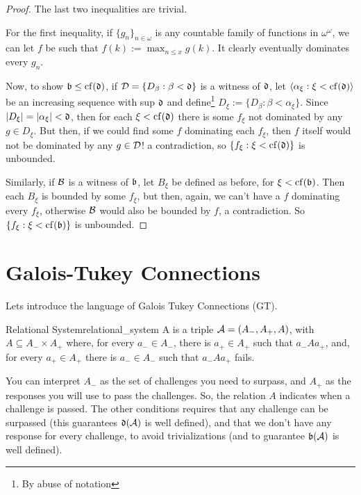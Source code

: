 \begin{proof}
    The last two inequalities are trivial.

    For the first inequality, if $\{g_n\}_{n\in\omega}$ is any countable family of functions in $\omega^\omega$, we can let $f$ be such that $f(k):=\max_{n\leq x}g(k)$. It clearly eventually dominates every $g_n$.

    Now, to show $\mathfrak{b}\leq\mathrm{cf}\!\left(\mathfrak{d}\right)$, if $\mathcal{D}=\{D_\beta:\beta<\mathfrak{d}\}$ is a witness of $\mathfrak{d}$, let $\langle\alpha_\xi:\xi<\mathrm{cf}\!\left(\mathfrak{d}\right)\rangle$ be an increasing sequence with sup $\mathfrak{d}$ and define\footnote{By abuse of notation} $D_\xi:=\{D_\beta:\beta<\alpha_\xi\}$. Since $\lvert D_\xi\rvert=\lvert\alpha_\xi\rvert<\mathfrak{d}$, then for each $\xi<\mathrm{cf}\!\left(\mathfrak{d}\right)$ there is some $f_\xi$ not dominated by any $g\in D_\xi$. But then, if we could find some $f$ dominating each $f_\xi$, then $f$ itself would not be dominated by any $g\in\mathcal{D}$! a contradiction, so $\{f_\xi:\xi<\mathrm{cf}\!\left(\mathfrak{d}\right)\}$ is unbounded.

    Similarly, if $\mathcal{B}$ is a witness of $\mathfrak{b}$, let $B_\xi$ be defined as before, for $\xi<\mathrm{cf}\!\left(\mathfrak{b}\right)$. Then each $B_\xi$ is bounded by some $f_\xi$, but then, again, we can't have a $f$ dominating every $f_\xi$, otherwise $\mathcal{B}$ would also be bounded by $f$, a contradiction. So $\{f_\xi:\xi<\mathrm{cf}\!\left(\mathfrak{b}\right)\}$ is unbounded.
\end{proof}

\section{Galois-Tukey Connections}

Lets introduce the language of Galois Tukey Connections (GT).

\begin{definition}{Relational System}{relational_system}
    A  is a triple $\mathcal{A}=(A_-,A_+,A)$, with $A\subseteq A_-\times A_+$ where, for every $a_-\in A_-$, there is $a_+\in A_+$ such that $a_-Aa_+$, and, for every $a_+\in A_+$ there is $a_-\in A_-$ such that $a_-Aa_+$ fails.
\end{definition}

You can interpret $A_-$ as the set of challenges you need to surpass, and $A_+$ as the responses you will use to pass the challenges. So, the relation $A$ indicates when a challenge is passed. The other conditions requires that any challenge can be surpassed (this guarantees $\mathfrak{d}(\mathcal{A})$ is well defined), and that we don't have any response for every challenge, to avoid trivializations (and to guarantee $\mathfrak{b}(\mathcal{A})$ is well defined).

